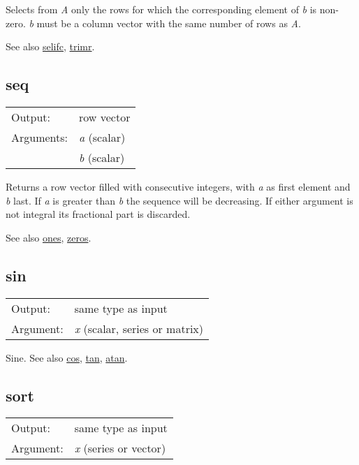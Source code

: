 	  Selects from \textsl{A} only the rows for which
	  the corresponding element of \textsl{b} is
	  non-zero. \textsl{b} must be a column vector with
	  the same number of rows as \textsl{A}.

	  See also \hyperlink{func-selifc}{selifc}, \hyperlink{func-trimr}{trimr}.

\subsection{seq}
\hypertarget{func-seq}{}

\begin{tabular}{ll}
Output:     & row vector\\
Arguments:  & \textsl{a} (scalar)\\
           & \textsl{b} (scalar)\\
\end{tabular}

	  Returns a row vector filled with consecutive integers, with
	  \textsl{a} as first element and \textsl{b}
	  last. If \textsl{a} is greater than
	  \textsl{b} the sequence will be decreasing. If either
	  argument is not integral its fractional part is discarded.

	  See also \hyperlink{func-ones}{ones}, \hyperlink{func-zeros}{zeros}.

\subsection{sin}
\hypertarget{func-sin}{}

\begin{tabular}{ll}
Output:     & same type as input\\
Argument:   & \textsl{x} (scalar, series or matrix)\\
\end{tabular}

	  Sine.  
	  See also \hyperlink{func-cos}{cos}, \hyperlink{func-tan}{tan}, \hyperlink{func-atan}{atan}.

\subsection{sort}
\hypertarget{func-sort}{}

\begin{tabular}{ll}
Output:     & same type as input\\
Argument:   & \textsl{x} (series or vector)\\
\end{tabular}

